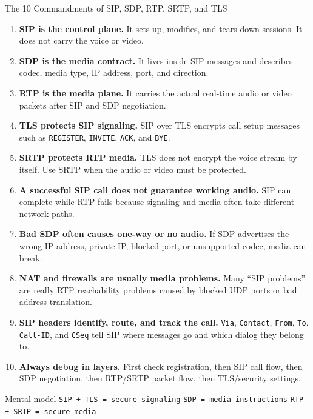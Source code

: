 \documentclass[aspectratio=169]{beamer}
\begin{document}
\begin{frame}{The 10 Commandments of SIP, SDP, RTP, SRTP, and TLS}
\scriptsize

\begin{enumerate}
    \item \textbf{SIP is the control plane.}  
    It sets up, modifies, and tears down sessions. It does not carry the voice or video.

    \item \textbf{SDP is the media contract.}  
    It lives inside SIP messages and describes codec, media type, IP address, port, and direction.

    \item \textbf{RTP is the media plane.}  
    It carries the actual real-time audio or video packets after SIP and SDP negotiation.

    \item \textbf{TLS protects SIP signaling.}  
    SIP over TLS encrypts call setup messages such as \texttt{REGISTER}, \texttt{INVITE}, \texttt{ACK}, and \texttt{BYE}.

    \item \textbf{SRTP protects RTP media.}  
    TLS does not encrypt the voice stream by itself. Use SRTP when the audio or video must be protected.

    \item \textbf{A successful SIP call does not guarantee working audio.}  
    SIP can complete while RTP fails because signaling and media often take different network paths.

    \item \textbf{Bad SDP often causes one-way or no audio.}  
    If SDP advertises the wrong IP address, private IP, blocked port, or unsupported codec, media can break.

    \item \textbf{NAT and firewalls are usually media problems.}  
    Many ``SIP problems'' are really RTP reachability problems caused by blocked UDP ports or bad address translation.

    \item \textbf{SIP headers identify, route, and track the call.}  
    \texttt{Via}, \texttt{Contact}, \texttt{From}, \texttt{To}, \texttt{Call-ID}, and \texttt{CSeq} tell SIP where messages go and which dialog they belong to.

    \item \textbf{Always debug in layers.}  
    First check registration, then SIP call flow, then SDP negotiation, then RTP/SRTP packet flow, then TLS/security settings.
\end{enumerate}

\vspace{0.15cm}

\begin{block}{Mental model}
\centering
\texttt{SIP + TLS = secure signaling}
\quad
\texttt{SDP = media instructions}
\quad
\texttt{RTP + SRTP = secure media}
\end{block}

\end{frame}
\end{document}
